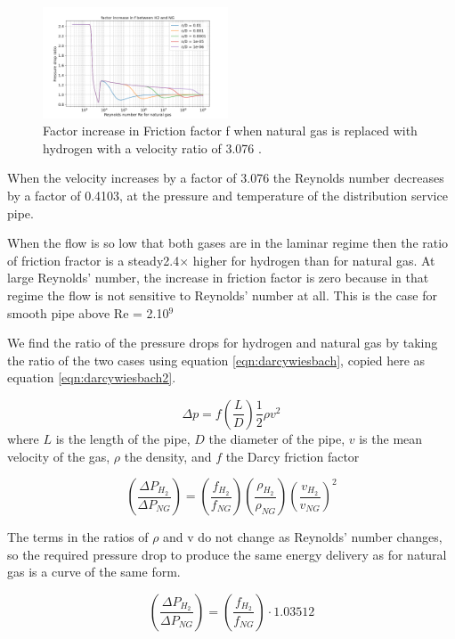 \documentclass[5p]{elsarticle} %
\begin{document}
\begin{figure}[htb]
\centering
\includegraphics[width=0.49\textwidth]{h2_ratio.png}
\caption{Factor increase in Friction factor f  when natural gas is replaced with hydrogen with a velocity ratio of 3.076 .}
\label{fig:h2ng}
\end{figure}
When the velocity increases by a factor of 3.076 the Reynolds number decreases by a factor of 0.4103, at the pressure and temperature of the distribution service pipe.

When the flow is so low that both gases are in the laminar regime then the ratio of friction fractor is a steady2.4$\times$ higher for hydrogen than for natural gas. At large Reynolds' number, the increase in friction factor is zero because in that regime the flow is not sensitive to Reynolds' number at all. This is the case for smooth pipe above Re = 2.10$^9$

We find the ratio of the pressure drops for hydrogen and natural gas by taking the ratio of the two cases using equation \eqref{eqn:darcywiesbach}, copied here as equation \eqref{eqn:darcywiesbach2}.

\begin{equation}
\label{eqn:darcywiesbach2}
\Delta p = f \left( \frac{L}{D} \right) \frac{1}{2} \rho v^2
\end{equation}
where $L$ is the length of the pipe,  $D$ the diameter of the pipe,  $v$ is the mean velocity of the gas, $\rho$ the density, and $f$ the Darcy friction factor

\begin{equation}
\label{eqn:pdropratioturb2}
    \left(\frac{\Delta P_{H_2}}{\Delta P_{NG}}\right) = 
    \left(\frac{f_{H_2}}{f_{NG}}\right)
    \left(\frac{\rho_{H_2}}{\rho_{NG}}\right)
    \left(\frac{v_{H_2}}{v_{NG}}\right)^{2} 
\end{equation}

The terms in the ratios of $\rho$ and v do not change as Reynolds' number changes, so the required pressure drop to produce the same energy delivery as for natural gas is a curve of the same form.


\begin{equation}
\label{eqn:pdropratioturb3}
    \left(\frac{\Delta P_{H_2}}{\Delta P_{NG}}\right) = 
    \left(\frac{f_{H_2}}{f_{NG}}\right)
    \cdot
    1.03512
\end{equation}
\end{document}
